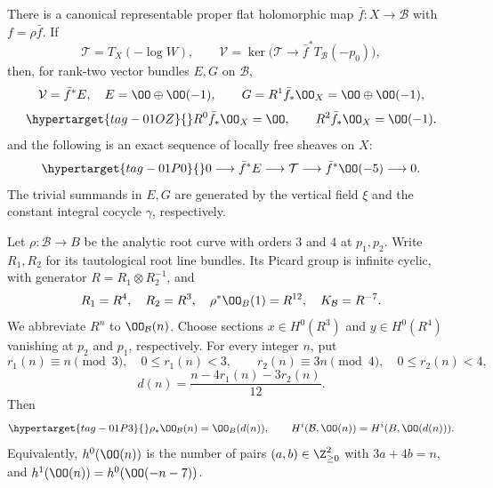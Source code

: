 
\begin{proposition}\hypertarget{tag-01SN}{}\label{inv:D1.2}


There is a canonical representable proper flat holomorphic map
$\bar f:X\to\mathcal B$ with $f=\rho\bar f$. If
\[
 \mathcal T=T_X(-\log W),\qquad
 \mathcal V=\ker\bigl(\mathcal T\to
                   \bar f^*T_{\mathcal B}(-p_0)\bigr),
\]
then, for rank-two vector bundles $E,G$ on $\mathcal B$,
\begin{equation}
 \mathcal V=\bar f^*E,\quad E=\OO\oplus\OO(-1),\qquad
 G=R^1\bar f_*\OO_X=\OO\oplus\OO(-1),
\label{pub:I:eq:D-2}
\end{equation}
\begin{equation}
 \hypertarget{tag-01OZ}{}\label{fam:eq:ab-direct-images}
R^0\bar f_*\OO_X=\OO,\qquad R^2\bar f_*\OO_X=\OO(-1).
\end{equation}
and the following is an exact sequence of locally free sheaves on $X$:
\begin{equation}
 \hypertarget{tag-01P0}{}\label{fam:eq:ab-log-tangent}
0\longrightarrow\bar f^*E\longrightarrow\mathcal T
 \longrightarrow\bar f^*\OO(-5)\longrightarrow0.       
\end{equation}
The trivial summands in $E,G$ are generated by the vertical field $\xi$
and the constant integral cocycle $\gamma$, respectively.
\end{proposition}

\begin{proposition}\hypertarget{tag-01SM}{}\label{inv:D1.1}


Let $\rho:\mathcal B\to B$ be the analytic root curve with orders $3$ and
$4$ at $p_1,p_2$. Write $R_1,R_2$ for its tautological root line bundles.
Its Picard group is infinite cyclic, with generator
$R=R_1\otimes R_2^{-1}$, and
\[
 R_1=R^4,\quad R_2=R^3,\quad \rho^*\OO_B(1)=R^{12},
 \quad K_{\mathcal B}=R^{-7}.
\]
We abbreviate $R^n$ to $\OO_{\mathcal B}(n)$. Choose sections
$x\in H^0(R^3)$ and $y\in H^0(R^4)$ vanishing at $p_2$ and $p_1$,
respectively. For every integer $n$, put
\[
 r_1(n)\equiv n\pmod3,\quad 0\le r_1(n)<3,
 \qquad r_2(n)\equiv3n\pmod4,\quad0\le r_2(n)<4,
\]
\[
 d(n)=\frac{n-4r_1(n)-3r_2(n)}{12}.
\]
Then
\begin{equation}
 \hypertarget{tag-01P3}{}\label{fam:eq:ab-root-degree}
\rho_*\OO_{\mathcal B}(n)=\OO_B(d(n)),\qquad
 H^i(\mathcal B,\OO(n))=H^i(B,\OO(d(n))).                 
\end{equation}
Equivalently, $h^0(\OO(n))$ is the number of pairs
$(a,b)\in\Z_{\ge0}^2$ with $3a+4b=n$, and
$h^1(\OO(n))=h^0(\OO(-n-7))$.
\end{proposition}

